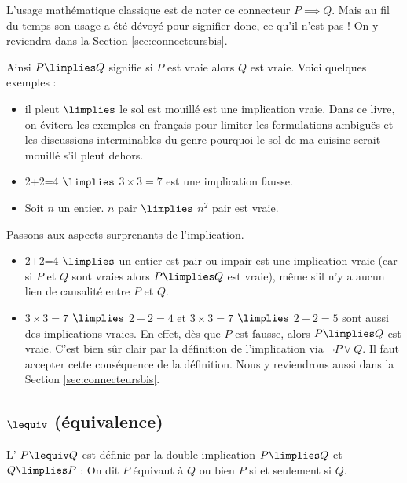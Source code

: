 \documentclass[11pt,class=report,crop=false]{standalone}
\begin{document}
L'usage mathématique classique est de noter ce connecteur $P \implies Q$. Mais au fil du temps son usage a été dévoyé pour signifier \og{}donc\fg{}, ce qu'il n'est pas ! On y reviendra dans la Section \ref{sec:connecteursbis}.

Ainsi \og{}$P \limplies Q$\fg{} signifie \og{}si $P$ est vraie alors $Q$ est vraie\fg{}.
Voici quelques exemples :
\begin{itemize}	
	\item \og{}il pleut\fg{} $\limplies$ \og{}le sol est mouillé\fg{} est une implication vraie. Dans ce livre, on évitera les exemples en français pour limiter les formulations ambiguës et les discussions interminables du genre \og{}pourquoi le sol de ma cuisine serait mouillé s'il pleut dehors\fg{}.
		
	\item \og{}2+2=4\fg{} $\limplies$ \og{}$3 \times 3 = 7$\fg{} est une implication fausse.
	
	\item Soit $n$ un entier. \og{}$n$ pair\fg{} $\limplies$ \og{}$n^2$ pair\fg{} est vraie.	
\end{itemize}

\bigskip

Passons aux aspects surprenants de l'implication.
\begin{itemize}	
	\item \og{}2+2=4\fg{} $\limplies$ \og{}un entier est pair ou impair\fg{} est une implication vraie (car si $P$ et $Q$ sont vraies alors $P \limplies Q$ est vraie), même s'il n'y a aucun lien de causalité entre $P$ et $Q$.
	
	\item \og{}$3 \times 3 = 7$\fg{} $\limplies$ \og{}$2+2=4$\fg{} 
	et \og{}$3 \times 3 = 7$\fg{} $\limplies$ \og{}$2+2=5$\fg{}
	sont aussi des implications vraies.
	En effet, dès que $P$ est fausse, alors $P \limplies Q$ est vraie. C'est bien sûr clair par la définition de l'implication via $\lnot P \lor Q$. Il faut accepter cette conséquence de la définition. Nous y reviendrons aussi dans la Section \ref{sec:connecteursbis}.
\end{itemize}


\subsection{$\lequiv$ (équivalence)}

L' $P \lequiv Q$ est définie par la double implication $P \limplies Q$ et $Q \limplies P$ :
On dit \og{}$P$ équivaut à $Q$\fg{} ou bien \og{}$P$ si et seulement si $Q$\fg{}.
\end{document}

